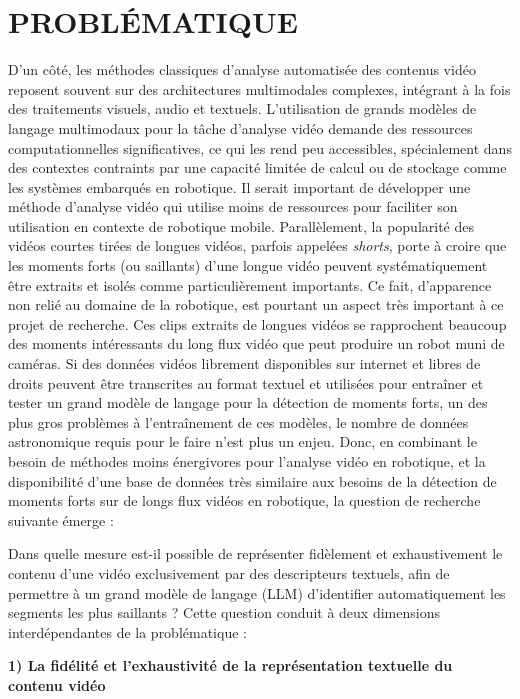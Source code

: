 \chapter{PROBLÉMATIQUE}

D’un côté, les méthodes classiques d'analyse automatisée des contenus vidéo reposent souvent sur des architectures multimodales complexes, intégrant à la fois des traitements visuels, audio et textuels. L’utilisation de grands modèles de langage multimodaux pour la tâche d’analyse vidéo demande des ressources computationnelles significatives, ce qui les rend peu accessibles, spécialement dans des contextes contraints par une capacité limitée de calcul ou de stockage comme les systèmes embarqués en robotique. Il serait important de développer une méthode d’analyse vidéo qui utilise moins de ressources pour faciliter son utilisation en contexte de robotique mobile.
Parallèlement, la popularité des vidéos courtes tirées de longues vidéos, parfois appelées \textit{shorts}, porte à croire que les moments forts (ou saillants) d'une longue vidéo peuvent systématiquement être extraits et isolés comme particulièrement importants. Ce fait, d’apparence non relié au domaine de la robotique, est pourtant un aspect très important à ce projet de recherche. Ces clips extraits de longues vidéos se rapprochent beaucoup des moments intéressants du long flux vidéo que peut produire un robot muni de caméras. Si des données vidéos librement disponibles sur internet et libres de droits peuvent être transcrites au format textuel et utilisées pour entraîner et tester un grand modèle de langage pour la détection de moments forts, un des plus gros problèmes à l’entraînement de ces modèles, le nombre de données astronomique requis pour le faire n’est plus un enjeu.
Donc, en combinant le besoin de méthodes moins énergivores pour l’analyse vidéo en robotique, et la disponibilité d’une base de données très similaire aux besoins de la détection de moments forts sur de longs flux vidéos en robotique, la question de recherche suivante émerge :

Dans quelle mesure est-il possible de représenter fidèlement et exhaustivement le contenu d'une vidéo exclusivement par des descripteurs textuels, afin de permettre à un grand modèle de langage (LLM) d'identifier automatiquement les segments les plus saillants ?
Cette question conduit à deux dimensions interdépendantes de la problématique :

\textbf{1) La fidélité et l'exhaustivité de la représentation textuelle du contenu vidéo}


